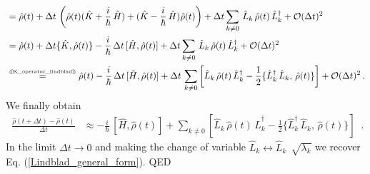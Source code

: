 \documentclass[11pt]{article}
\numberwithin{equation}{section} %
\numberwithin{figure}{section} %
\newcommand\numeq[1] %
  {\stackrel{\scriptscriptstyle(\mkern-1.5mu#1\mkern-1.5mu)}{=}}
\begin{document}
\begin{appendices}
\begin{equation}
\begin{split}
&=\hat{\rho}(t)+ \Delta t	\, \left(\hat{\rho}(t)(\hat{K}+\frac{i}{\hbar}\,\hat{H})+(\hat{K}-\frac{i}{\hbar}\,\hat{H})\hat{\rho}(t)\right) + \Delta t \sum_{k\neq 0}\,\hat{L}_k\,\hat{\rho}(t)\,\hat{L}_k^\dagger + \mathcal{O}(\Delta t)^2\\
&=\hat{\rho}(t)+ \Delta t \{\hat{K},\hat{\rho}(t)\}-\frac{i}{\hbar}\,\Delta t\,[\hat{H},\hat{\rho}(t)] + \Delta t \sum_{k\neq 0}\,\hat{L}_k\,\hat{\rho}(t)\,\hat{L}_k^\dagger + \mathcal{O}(\Delta t)^2\\
&\numeq{\textrm{\ref{K_operator_lindblad}}}\hat{\rho}(t)-\frac{i}{\hbar}\,\Delta t\,[\hat{H},\hat{\rho}(t)] + \Delta t\,\sum_{k\neq 0} \left[ \hat{L}_k\,\hat{\rho}(t)\,\hat{L}_k^\dagger -\frac{1}{2}\{\hat{L}_k^\dagger\,\hat{L}_k,\,\hat{\rho}(t)\}  \right] + \mathcal{O}(\Delta t)^2\,\textrm{.}
\end{split}
\end{equation}
We finally obtain
\begin{equation} 
\begin{split}
\frac{\hat{\rho}(t+\Delta t)-\hat{\rho}(t)}{\Delta t}
&\approx-\frac{i}{\hbar}\,[\hat{H},\hat{\rho}(t)] +\sum_{k\neq 0} \left[ \hat{L}_k\,\hat{\rho}(t)\,\hat{L}_k^\dagger -\frac{1}{2}\{\hat{L}_k^\dagger\,\hat{L}_k,\,\hat{\rho}(t)\}  \right]
\end{split}\,\textrm{.}
\end{equation}
In the limit $\Delta t\to 0$ and making the change of variable $\hat{L}_k\leftrightarrow \hat{L}_k\,\sqrt[]{\lambda_k}$ we recover Eq. (\ref{Lindblad_general_form}). QED



\end{appendices}
\end{document}
